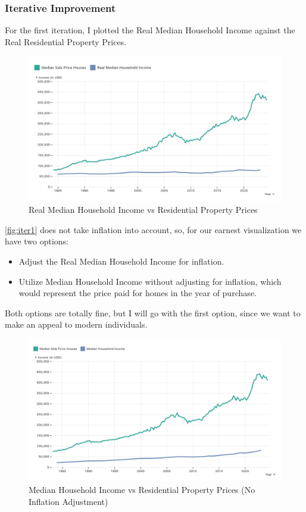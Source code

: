 \documentclass{article}
\begin{document}
\subsubsection{Iterative Improvement}

For the first iteration, I plotted the Real Median Household Income against the Real Residential Property Prices.

\begin{figure}[ht] 
  \centering
  \includegraphics[width=.90\textwidth]{figs/iter1.png}
  \caption{
      Real Median Household Income vs Residential Property Prices
  }
  \label{fig:iter1}
\end{figure}

\autoref{fig:iter1} does not take inflation into account, so, for our earnest visualization we have two options:

\begin{itemize}
  \item Adjust the Real Median Household Income for inflation.
  \item Utilize Median Household Income without adjusting for inflation, which would represent the price paid for homes in the year of purchase.
\end{itemize}

Both options are totally fine, but I will go with the first option, since we want to make an appeal to modern individuals. 

\begin{figure}[ht] 
  \centering
  \includegraphics[width=.75\textwidth]{figs/iter2.png}
  \caption{
      Median Household Income vs Residential Property Prices (No Inflation Adjustment)
  }
  \label{fig:iter2}
\end{figure}
\end{document}
